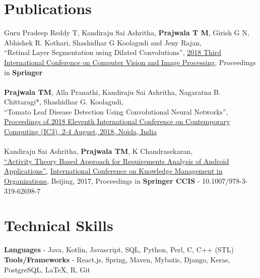 \documentclass[margin, centered]{res}
\begin{document}
\begin{resume}

\section{Publications}
Guru Pradeep Reddy T, Kandiraju Sai Ashritha, \textbf{Prajwala T M}, Girish G N, Abhishek R. Kothari, Shashidhar G Koolagudi and Jeny Rajan, \\
{``Retinal Layer Segmentation using Dilated Convolutions''}, \href{http://www.iiitdmj.ac.in/CVIP-2018/}{2018 Third International Conference on Computer Vision and Image Processing}, Proceedings in \textbf{Springer} \\ \\
\textbf{Prajwala TM}, Alla Pranathi, Kandiraju Sai Ashritha, Nagaratna B. Chittaragi*, Shashidhar G. Koolagudi, \\
{``Tomato Leaf Disease Detection Using Convolutional Neural Networks''}, \href{http://www.jiit.ac.in/jiit/ic3/home.html}{Proceedings of 2018 Eleventh International Conference on Contemporary Computing (IC3), 2-4 August, 2018, Noida, India} \\ \\
Kandiraju Sai Ashritha, \textbf{Prajwala TM}, K Chandrasekaran,\\ \href{https://link.springer.com/chapter/10.1007/978-3-319-62698-7_1}{``Activity Theory Based Approach for 
Requirements Analysis of Android Applications''}, \href{http://www.kmo2017.com/}{International Conference on Knowledge Management in Organizations}, Beijing, 2017, Proceedings in \textbf{Springer CCIS} - 10.1007/978-3-319-62698-7 

\section{Technical \hspace{2mm} Skills}
\textbf{Languages} - Java, Kotlin, Javascript, SQL, Python, Perl, C, C++ (STL)\\
\textbf{Tools/Frameworks} - React.js, Spring, Maven, Mybatis, Django, Keras, PostgreSQL, \LaTeX, R, Git


\end{resume}
\end{document}
